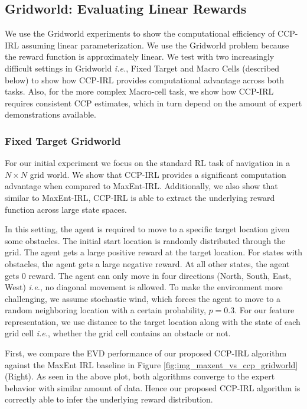 \documentclass{article}
\begin{document}
\subsection{Gridworld: Evaluating Linear Rewards} 

We use the Gridworld experiments to show the computational efficiency of CCP-IRL assuming linear parameterization. We use the Gridworld problem because the reward function is approximately linear. We test with two increasingly difficult settings in Gridworld \emph{i.e.}, Fixed Target and Macro Cells (described below) to show how CCP-IRL provides computational advantage across both tasks. Also, for the more complex Macro-cell task, we show how CCP-IRL requires consistent CCP estimates, which in turn depend on the amount of expert demonstrations available.

\subsubsection{Fixed Target Gridworld}

For our initial experiment we focus on the standard RL task of navigation in a $N \times N$ grid world. We show that CCP-IRL provides a significant computation advantage when compared to MaxEnt-IRL. Additionally, we also show that similar to MaxEnt-IRL, CCP-IRL is able to extract the underlying reward function across large state spaces.

In this setting, the agent is required to move to a specific target location given some obstacles. The initial start location is randomly distributed through the grid. The agent gets a large positive reward at the target location. For states with obstacles, the agent gets a large negative reward. At all other states, the agent gets $0$ reward. The agent can only move in four directions (North, South, East, West) \emph{i.e.}, no diagonal movement is allowed. To make the environment more challenging, we assume stochastic wind, which forces the agent to move to a random neighboring location with a certain probability, $p = 0.3$.
For our feature representation, we use distance to the target location along with the state of each grid cell \emph{i.e.}, whether the grid cell contains an obstacle or not.

First, we compare the EVD performance of our proposed CCP-IRL algorithm against the MaxEnt IRL baseline in Figure \ref{fig:img_maxent_vs_ccp_gridworld} (Right).
As seen in the above plot, both algorithms converge to the expert behavior with similar amount of data. 
Hence our proposed CCP-IRL algorithm is correctly able to infer the underlying reward distribution.%
\end{document}
